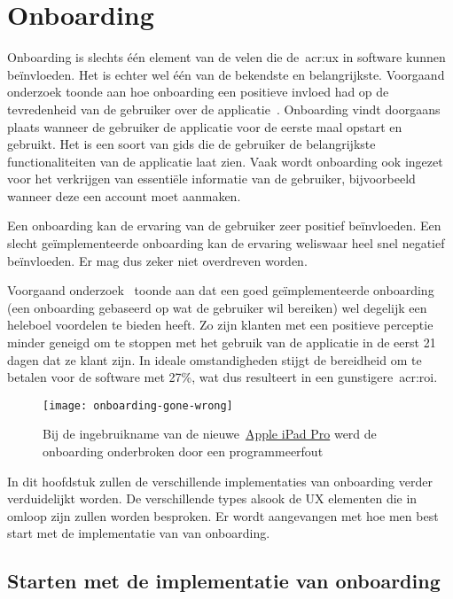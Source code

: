 \section{Onboarding}
\label{sec:onboarding}

Onboarding is slechts één element van de velen die de~\acrlong{acr:ux} in software kunnen beïnvloeden. Het is echter wel één van de bekendste en belangrijkste. Voorgaand onderzoek toonde aan hoe onboarding een positieve invloed had op de tevredenheid van de gebruiker over de applicatie~\autocite{Cardoso2017}. Onboarding vindt doorgaans plaats wanneer de gebruiker de applicatie voor de eerste maal opstart en gebruikt. Het is een soort van gids die de gebruiker de belangrijkste functionaliteiten van de applicatie laat zien. Vaak wordt onboarding ook ingezet voor het verkrijgen van essentiële informatie van de gebruiker, bijvoorbeeld wanneer deze een account moet aanmaken.

Een onboarding kan de ervaring van de gebruiker zeer positief beïnvloeden. Een slecht geïmplementeerde onboarding kan de ervaring weliswaar heel snel negatief beïnvloeden. Er mag dus zeker niet overdreven worden.

Voorgaand onderzoek~\autocite{Desai2019} toonde aan dat een goed geïmplementeerde onboarding (een onboarding gebaseerd op wat de gebruiker wil bereiken) wel degelijk een heleboel voordelen te bieden heeft. Zo zijn klanten met een positieve perceptie minder geneigd om te stoppen met het gebruik van de applicatie in de eerst 21 dagen dat ze klant zijn. In ideale omstandigheden stijgt de bereidheid om te betalen voor de software met 27\%, wat dus resulteert in een gunstigere~\acrfull{acr:roi}.

\begin{figure}
    \centering
    \texttt{[image: onboarding-gone-wrong]}
    \caption[Implementatiefout bij onboarding]{Bij de ingebruikname van de nieuwe~\href{https://www.apple.com/ipad-pro/}{Apple iPad Pro} werd de onboarding onderbroken door een programmeerfout}
    \label{fig:onboarding:fout}
\end{figure}

In dit hoofdstuk zullen de verschillende implementaties van onboarding verder verduidelijkt worden. De verschillende types alsook de UX elementen die in omloop zijn zullen worden besproken. Er wordt aangevangen met hoe men best start met de implementatie van van onboarding.

\subsection{Starten met de implementatie van onboarding}
\label{sec:onboarding:start}

